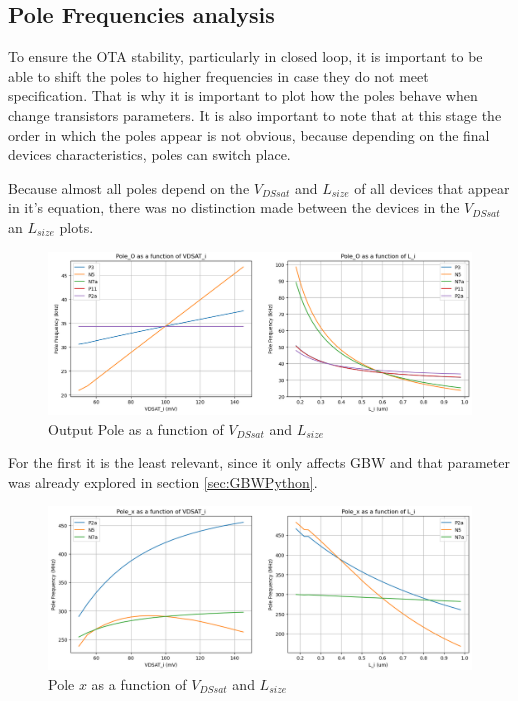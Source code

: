 \subsection{Pole Frequencies analysis}

To ensure the OTA stability, particularly in closed loop, it is important to be able to shift the poles to higher frequencies in case they do not meet specification. That is why it is important to plot how the poles behave when change transistors parameters. It is also important to note that at this stage the order in which the poles appear is not obvious, because depending on the final devices characteristics, poles can switch place.  

Because almost all poles depend on the $V_{DSsat}$ and $L_{size}$ of all devices that appear in it's equation, there was no distinction made between the devices in the $V_{DSsat}$ an $L_{size}$ plots.

\begin{figure}[H]
    \centering
    \includegraphics[width=1\textwidth]{Images/PoPlot.png}
    \caption{Output Pole as a function of $V_{DSsat}$ and $L_{size}$}
    \label{fig:PoPlot}
\end{figure}

For the first it is the least relevant, since it only affects GBW and that parameter was already explored in section \ref{sec:GBWPython}.

\begin{figure}[H]
    \centering
    \includegraphics[width=1\textwidth]{Images/PxPlot.png}
    \caption{Pole $x$ as a function of $V_{DSsat}$ and $L_{size}$}
    \label{fig:PxPlot}
\end{figure}

